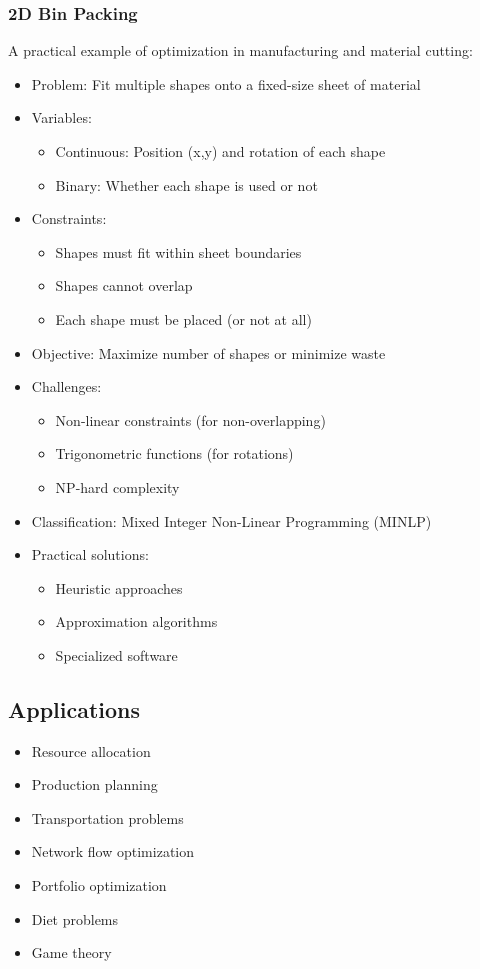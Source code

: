 \documentclass[11pt,a4paper]{article}
\begin{document}
\begin{multicols}{2}
\subsubsection{2D Bin Packing}
A practical example of optimization in manufacturing and material cutting:
\begin{itemize}
    \item Problem: Fit multiple shapes onto a fixed-size sheet of material
    \item Variables: 
    \begin{itemize}
        \item Continuous: Position (x,y) and rotation of each shape
        \item Binary: Whether each shape is used or not
    \end{itemize}
    \item Constraints:
    \begin{itemize}
        \item Shapes must fit within sheet boundaries
        \item Shapes cannot overlap
        \item Each shape must be placed (or not at all)
    \end{itemize}
    \item Objective: Maximize number of shapes or minimize waste
    \item Challenges:
    \begin{itemize}
        \item Non-linear constraints (for non-overlapping)
        \item Trigonometric functions (for rotations)
        \item NP-hard complexity
    \end{itemize}
    \item Classification: Mixed Integer Non-Linear Programming (MINLP)
    \item Practical solutions:
    \begin{itemize}
        \item Heuristic approaches
        \item Approximation algorithms
        \item Specialized software
    \end{itemize}
\end{itemize}

\subsection{Applications}
\begin{itemize}
    \item Resource allocation
    \item Production planning
    \item Transportation problems
    \item Network flow optimization
    \item Portfolio optimization
    \item Diet problems
    \item Game theory
\end{itemize}


\end{multicols}
\end{document}
